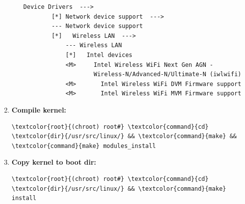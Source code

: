 \documentclass[10pt, a4paper, onecolumn, oneside, titlepage, openany]{book}
\begin{document}
\begin{enumerate}
\begin{enumerate}
\begin{Verbatim}[commandchars=\\\{\}]
Device Drivers  --->
        [*] Network device support  --->
        --- Network device support
        [*]   Wireless LAN  --->
            --- Wireless LAN
            [*]   Intel devices
            <M>     Intel Wireless WiFi Next Gen AGN -
                    Wireless-N/Advanced-N/Ultimate-N (iwlwifi)
            <M>       Intel Wireless WiFi DVM Firmware support
            <M>       Intel Wireless WiFi MVM Firmware support
\end{Verbatim}
    \end{enumerate}
    \item \textbf{Compile kernel:}
\begin{Verbatim}[commandchars=\\\{\}]
\textcolor{root}{(chroot) root#} \textcolor{command}{cd} \textcolor{dir}{/usr/src/linux/} && \textcolor{command}{make} && \textcolor{command}{make} modules_install
\end{Verbatim}
    \item \textbf{Copy kernel to boot dir:}
\begin{Verbatim}[commandchars=\\\{\}]
\textcolor{root}{(chroot) root#} \textcolor{command}{cd} \textcolor{dir}{/usr/src/linux/} && \textcolor{command}{make} install
\end{Verbatim}
\end{enumerate}
\end{document}
